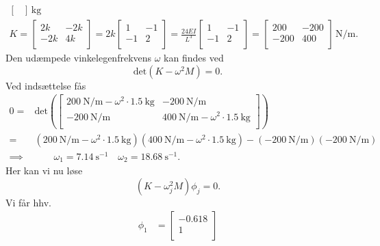 \begin{derivation}
\begin{gather*}
\begin{bmatrix}
    \end{bmatrix} \, \unit{\kg}\\
      K = \begin{bmatrix}
      2k & -2k\\
      -2k & 4k\\
      \end{bmatrix} = 2k \begin{bmatrix}
      1 & -1\\
      -1 & 2\\
      \end{bmatrix} = \frac{24 EI}{L^3} \begin{bmatrix}
      1 & -1\\
      -1 & 2\\
      \end{bmatrix} = \begin{bmatrix}
      200 & -200\\
      -200 & 400\\
      \end{bmatrix}\, \unit{\N\per\m}
    .\end{gather*}
    Den udæmpede vinkelegenfrekvens $\omega$ kan findes ved
    \[ 
    \mathrm{det} \left( K - \omega^2 M \right) = 0
    .\]
    Ved indsættelse fås
    \begin{align*}
      0 =& \mathrm{det} \left( \begin{bmatrix}
    \qty{200}{\N\per\m} - \omega^2 \cdot \qty{1,5}{\kg} & \qty{-200}{\N\per\m} \\
    \qty{-200}{\N\per\m} & \qty{400}{\N\per\m} - \omega^2 \cdot \qty{1,5}{\kg} \\
\end{bmatrix} \right) \\
          =& \left( \qty{200}{\N\per\m} - \omega^2 \cdot \qty{1,5}{\kg} \right) \left( \qty{400}{\N\per\m} - \omega^2 \cdot \qty{1,5}{\kg}  \right) - \left( \qty{-200}{\N\per\m}  \right) \left( \qty{-200}{\N\per\m}  \right) \\
          \implies& \qquad \omega_1 = \qty{7,14}{\s^{-1}} \quad \omega_2 = \qty{18,68}{\s^{-1}}
    .\end{align*}
    Her kan vi nu løse
    \[ 
      \left( K - \omega^2_j M \right)\phi_j = 0
    .\]
    Vi får hhv.
    \begin{align*}
      \phi_1 &= \begin{bmatrix}
      - \num{0,618}\\
      1\\
      \end{bmatrix} \\

\end{align*}
\end{derivation}
